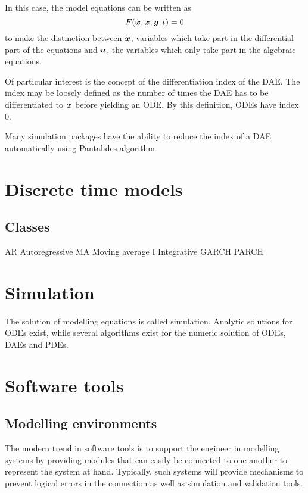 In this case, the model equations can be written as
\begin{equation}
  \label{eq:daeform}
  F(\dot{\boldsymbol{x}}, \boldsymbol{x}, \boldsymbol{y}, t) = 0
\end{equation}
to make the distinction between $\boldsymbol{x}$, variables which take part in the differential part of the equations and $\boldsymbol{u}$, the variables which only take part in the algebraic equations.


Of particular interest is the concept of the differentiation index of the DAE.
The index may be loosely defined as the number of times the DAE has to be differentiated to $\boldsymbol{x}$ before yielding an ODE.
By this definition, ODEs have index 0.

Many simulation packages have the ability to reduce the index of a DAE automatically using Pantalides algorithm 


\section{Discrete time models}
\subsection{Classes}
AR Autoregressive
MA Moving average
I Integrative
GARCH
PARCH

\section{Simulation}
The solution of modelling equations is called simulation.  
Analytic solutions for ODEs exist, while several algorithms exist for the numeric solution of ODEs, DAEs and PDEs.

\section{Software tools}
\subsection{Modelling environments}
The modern trend in software tools is to support the engineer in modelling systems by providing modules that can easily be connected to one another to represent the system at hand.
Typically, such systems will provide mechanisms to prevent logical errors in the connection as well as simulation and validation tools.


